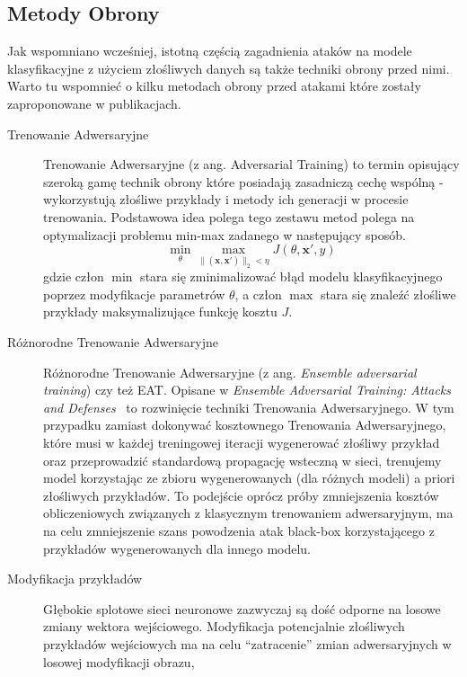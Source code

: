\documentclass[
    left=2.5cm,         %
    right=2.5cm,        %
    top=2.5cm,          %
    bottom=3cm,         %
    bindingoffset=6mm,  %
    nohyphenation=false %
]{eiti/eiti-thesis}
\renewcommand{\vec}[1]{\mathbf{#1}}
\begin{document}
\subsection{Metody Obrony}\label{secition:metody_obrony}
Jak wspomniano wcześniej, istotną częścią zagadnienia ataków na modele klasyfikacyjne z użyciem złośliwych danych są
także techniki obrony przed nimi. Warto tu wspomnieć o kilku metodach obrony przed atakami które zostały
zaproponowane w publikacjach.
\begin{description}
    \item[Trenowanie Adwersaryjne]
    Trenowanie Adwersaryjne (z ang. Adversarial Training)\cite{DBLP:journals/corr/abs-1712-07107} to termin opisujący szeroką gamę technik obrony które posiadają
    zasadniczą cechę wspólną - wykorzystują złośliwe przykłady i metody ich generacji w procesie trenowania.
    Podstawowa idea polega tego zestawu metod polega na optymalizacji problemu min-max zadanego w następujący sposób.
    \begin{equation}
        \min _{\theta} \max _{\|(\vec{x}, \vec{x'})\|_2<\eta} J(\theta, \vec{x'}, y)
    \end{equation}
    gdzie człon $\min$ stara się zminimalizować błąd modelu klasyfikacyjnego poprzez modyfikacje parametrów $\theta$, a człon $\max$ stara się znaleźć
    złośliwe przykłady maksymalizujące funkcję kosztu $J$.
    \item[Różnorodne Trenowanie Adwersaryjne]
        Różnorodne Trenowanie Adwersaryjne (z ang. \textit{Ensemble adversarial training}) czy też EAT. Opisane w \textit{Ensemble Adversarial Training: Attacks and Defenses}~\cite{Tramr2018EnsembleAT} to rozwinięcie
        techniki Trenowania Adwersaryjnego. W tym przypadku zamiast dokonywać kosztownego Trenowania Adwersaryjnego,
        które musi w każdej treningowej iteracji wygenerować złośliwy przykład oraz przeprowadzić standardową propagację wsteczną w sieci,
        trenujemy model korzystając ze zbioru wygenerowanych (dla różnych modeli) a priori złośliwych przykładów.
        To podejście oprócz próby zmniejszenia kosztów obliczeniowych związanych z klasycznym trenowaniem adwersaryjnym, ma na celu
        zmniejszenie szans powodzenia atak black-box korzystającego z przykładów wygenerowanych dla innego modelu.
    \item[Modyfikacja przykładów]
        Głębokie splotowe sieci neuronowe zazwyczaj są dość odporne na losowe zmiany wektora wejściowego.
        Modyfikacja potencjalnie złośliwych przykładów wejściowych ma na celu ``zatracenie'' zmian adwersaryjnych w losowej modyfikacji obrazu,

\end{description}
\end{document}
